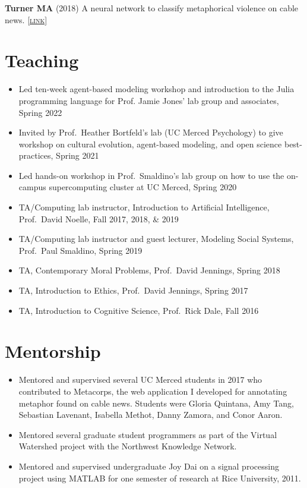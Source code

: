 \documentclass[11pt, letterpaper]{article}
\newcommand{\lurl}[1]{\href{#1}{\scriptsize\textsc{[link]}}}
\begin{document}
  \textbf{Turner MA} (2018) A neural network to classify metaphorical violence
  on cable news. \lurl{https://arxiv.org/abs/1810.08677}


\section*{Teaching}

\begin{itemize}
  \item
   Led ten-week agent-based modeling workshop and introduction to the Julia
    programming language for Prof. Jamie Jones' lab group and associates,
    Spring 2022

  \item
   Invited by Prof.\ Heather Bortfeld's lab (UC Merced Psychology) to give workshop on cultural evolution, agent-based modeling, and open science best-practices, Spring 2021

 \item
   Led hands-on workshop in Prof.\ Smaldino's lab group on how to use the on-campus supercomputing cluster at UC Merced, Spring 2020

 \item
   TA/Computing lab instructor, Introduction to Artificial Intelligence, Prof.\ David Noelle, Fall 2017, 2018, \& 2019

 \item
   TA/Computing lab instructor and guest lecturer, Modeling Social Systems, Prof.\ Paul Smaldino, Spring 2019
 \item
   TA, Contemporary Moral Problems, Prof.\ David Jennings, Spring 2018
 \item
   TA, Introduction to Ethics, Prof.\ David Jennings, Spring 2017
 \item
   TA, Introduction to Cognitive Science, Prof.\ Rick Dale, Fall 2016

\end{itemize}

 \section*{Mentorship}

\begin{itemize}
  \item Mentored and supervised several UC Merced students in 2017 
    who contributed to
    Metacorps, the web application I developed for annotating metaphor found
    on cable news. Students were Gloria Quintana, Amy Tang, Sebastian Lavenant, Isabella Methot,
    Danny Zamora, and Conor Aaron.
  \item
    Mentored several graduate student programmers as part of the Virtual Watershed
    project with the Northwest Knowledge Network.
  \item Mentored and supervised undergraduate Joy Dai on a signal processing project using MATLAB for
    one semester of research at Rice University, 2011.
\end{itemize}
\end{document}
